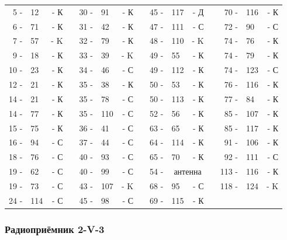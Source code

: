 \documentclass[12pt]{article}
\newcommand{\mc}{\multicolumn}
\begin{document}
\begin{tabular}{r l r p{0.5cm} r l r p{0.5cm} r l r p{0.5cm} r l r}
 5 - & 12  & - К &     & 30 - & 91     &   - К    &      &  45 - & 117 & - Д          &     &  70 - & 116 & - К\\
 6 - & 71  & - К &     & 31 - & 42     &   - К    &      &  47 - & 111 & - С          &     &  72 - &  90 & - С\\
 7 - & 57  & - K &     & 32 - & 79     &   - К    &      &  48 - & 110 & - K          &     &  74 - &  76 & - К\\
 9 - & 18  & - К &     & 33 - & 39     &   - K    &      &  49 - &  55 & - К          &     &  74 - &  79 & - К\\
10 - & 23  & - К &     & 34 - & 46     &   - С    &      &  49 - & 112 & - К          &     &  74 - & 123 & - С\\
12 - & 21  & - К &     & 35 - & 38     &   - К    &      &  50 - &  53 & - К          &     &  76 - & 116 & - К\\
14 - & 21  & - К &     & 35 - & 78     &   - С    &      &  50 - & 113 & - К          &     &  77 - &  84 & - К\\
14 - & 77  & - К &     & 35 - & 110    &   - С    &      &  52 - &  56 & - К          &     &  85 - & 107 & - К\\
15 - & 75  & - К &     & 36 - & 41     &   - С    &      &  63 - &  65 & - К          &     &  85 - & 117 & - К\\
16 - & 94  & - С &     & 37 - & 44     &   - С    &      &  64 - & 114 & - К          &     &  91 - & 106 & - К\\
18 - & 76  & - С &     & 40 - & 93     &   - С    &      &  65 - &  70 & - К          &     &  92 - & 111 & - С\\
19 - & 62  & - С &     & 40 - & 99     &   - С    &      &  54 - & \mc{2}{c}{антенна} &     & 113 - & 116 & - К\\
19 - & 73  & - С &     & 43 - & 107    &   - K    &      &  68 - &  95 & - С          &     & 118 - & 124 & - K\\
24 - & 114 & - С &     & 45 - & 98     &   - С    &      &  69 - & 115 & - К          &     &       &     &    \\
\end{tabular}

\hrulefill

\subsubsection{Радиоприёмник 2-V-3}
\end{document}
